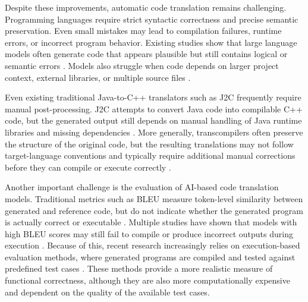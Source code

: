 Despite these improvements, automatic code translation remains challenging.
Programming languages require strict syntactic correctness and precise semantic
preservation. Even small mistakes may lead to compilation failures, runtime
errors, or incorrect program behavior. Existing studies show that large language
models often generate code that appears plausible but still contains logical or
semantic errors \cite{llm_limitations, correctness_llm}. Models also struggle
when code depends on larger project context, external libraries, or multiple
source files \cite{evaluation_limitations, long_context_llm}.


Even existing traditional Java-to-C++ translators such as J2C \cite{j2c_tool} frequently require manual post-processing. J2C
attempts to convert Java code into compilable C++ code, but the generated output
still depends on manual handling of Java runtime libraries and missing
dependencies \cite{traditional_translation_survey}. More generally,
transcompilers often preserve the structure of the original code, but the
resulting translations may not follow target-language conventions and typically
require additional manual corrections before they can compile or execute
correctly \cite{roziere2020transcoder}.

Another important challenge is the evaluation of AI-based code translation models.
Traditional metrics such as BLEU \cite{bleu_metric} measure token-level similarity between
generated and reference code, but do not indicate whether the generated program
is actually correct or executable \cite{tran2019ruby}.
Multiple studies have shown that models with high BLEU scores may still fail to
compile or produce incorrect outputs during execution \cite{evtikhiev2022bleu, huang2022exeds}. Because of this, recent research increasingly relies on
execution-based evaluation methods, where generated programs are compiled and
tested against predefined test cases \cite{codescore2023}. These
methods provide a more realistic measure of functional correctness, although
they are also more computationally expensive and dependent on the quality of the
available test cases.